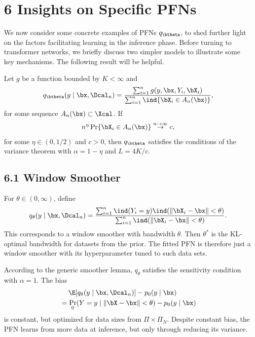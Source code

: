 \documentclass[aspectratio=169,10pt]{beamer}
\newcommand{\currentheading}{\ifx\insertsubsection\empty\insertsection\else\insertsubsection\fi}
\begin{document}
\section{6 Insights on Specific PFNs}

\begin{frame}{\currentheading}
We now consider some concrete examples of PFNs $q_{\btheta}$, to shed further light on the factors facilitating learning in the inference phase. Before turning to transformer networks, we briefly discuss two simpler models to illustrate some key mechanisms. The following result will be helpful.
\end{frame}

\begin{frame}{\currentheading}
\begin{lemma}[6.1]\label{lem:generic-smoother}
Let $g$ be a function bounded by $K < \infty$ and
\begin{align*}
	q_{\btheta}(y \mid \bx, \Dcal_n) = \frac{\sum_{i = 1}^n g(y, \bx, Y_i, \bX_i)}{\sum_{i = 1}^n  \ind\{\bX_i \in A_n(\bx)\}},
\end{align*}
for some sequence $A_n(\bx) \subset \Xcal$. If
$$n^\eta\Pr\{\bX_i \in A_n(\bx)\} \stackrel{n \to \infty}\rightarrow  c,$$
for some $\eta \in (0, 1/2)$ and $c > 0$, then $q_{\btheta}$ satisfies the conditions of the variance theorem with $\alpha = 1 - \eta$ and $L = 4K / c$.
\end{lemma}
\end{frame}

\subsection{6.1 Window Smoother}

\begin{frame}{\currentheading}
For $\theta \in (0, \infty)$, define
\begin{align*}
	q_{\theta}(y \mid \bx, \Dcal_n)
	= \frac{\sum_{i = 1}^n \ind(Y_i = y) \ind(\| \bX_i - \bx\| < \theta)}{\sum_{i = 1}^n  \ind(\| \bX_i - \bx\| < \theta)}.
\end{align*}
This corresponds to a window smoother with bandwidth $\theta$. Then $\theta^*$ is the KL-optimal bandwidth for datasets from the prior. The fitted PFN is therefore just a window smoother with its hyperparameter tuned to such data sets.
\end{frame}

\begin{frame}{\currentheading}
According to the generic smoother lemma, $q_\theta$ satisfies the sensitivity condition with $\alpha = 1$. The bias
\begin{align*}
	&\quad \: \E[q_{\theta}(y \mid \bx, \Dcal_n)]  - p_0(y \mid \bx) \\
    &= \Pr_0(Y = y \mid \| \bX - \bx\| < \theta ) - p_0(y \mid \bx)
\end{align*}
is constant, but optimized for data sizes from $\Pi \times \Pi_N$. Despite constant bias, the PFN learns from more data at inference, but only through reducing its variance.
\end{frame}
\end{document}

